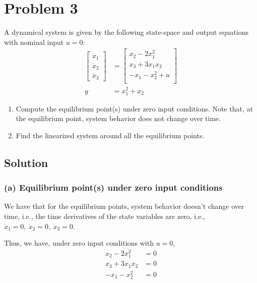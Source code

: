 \section*{Problem 3}

A dynamical system is given by the following state-space and output equations with nominal input \( u = 0\):
\begin{align*}
    \begin{bmatrix}
        \dot{x}_1 \\
        \dot{x}_2 \\
        \dot{x}_3
    \end{bmatrix}
      & =
    \begin{bmatrix}
        x_2 - 2 x_1^2    \\
        x_3 + 3 x_1 x_2  \\
        -x_1 - x_2^2 + u \\
    \end{bmatrix}
    \\
    y & = x_1^2 + x_2
\end{align*}

\begin{enumerate}[label= (\alph*)]
    \item Compute the equilibrium point(s) under zero input conditions.
          Note that, at the equilibrium point, system behavior does not change over time.
    \item Find the linearized system around all the equilibrium points.
\end{enumerate}

\subsection*{Solution}

\subsubsection*{(a) Equilibrium point(s) under zero input conditions}

We have that for the equilibrium points, system behavior doesn't change over time, i.e., the time derivatives of the state variables are zero, i.e., \( \dot x_1 = 0, \ \dot x_2 = 0, \ \dot x_3 = 0 \).

Thus, we have, under zero input conditions with \( u = 0 \),
\begin{align*}
    x_2 - 2 x_1^2   & = 0 \\
    x_3 + 3 x_1 x_2 & = 0 \\
    -x_1 - x_2^2    & = 0
\end{align*}

